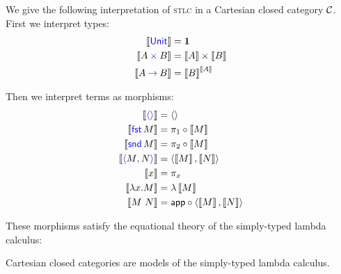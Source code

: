 We give the following interpretation of \textsc{stlc} 
in a Cartesian closed category $\mathcal C$. 
First we interpret types:
\begin{align*}
  \left\llbracket \mathsf{{\color{blue}Unit}} \right\rrbracket &= \mathbf{1} \\ 
  \left\llbracket A \mathbin{{\color{blue}\times}} B \right\rrbracket &= \left\llbracket A \right\rrbracket \times \left\llbracket B \right\rrbracket \\ 
  \left\llbracket A \mathbin{{\color{blue}\to}} B \right\rrbracket &= \left\llbracket B \right\rrbracket^{\left\llbracket A \right\rrbracket}
\end{align*}

Then we interpret terms as morphisms:
    \begin{align*}
    \llbr{\plunit} &= \angled{} \\
    \llbr{\plfst{M}} &= \pi_1 \circ \llbr{M} \\
    \llbr{\plsnd{M}} &= \pi_2 \circ \llbr{M} \\
    \llbr{\plpair{M}{N}} &= \angled{\llbr{M},\llbr{N}} \\
    \llbr{x} &= \pi_x \\
    \llbr{\lambda x . M} &= \lambda \dbracket{M} \\ 
    \llbr{M~N} &= \app \circ \langle \dbracket{M}, \dbracket{N} \rangle
  \end{align*}

These morphisms satisfy the equational theory of the simply-typed 
lambda calculus:
\begin{theorem}
  Cartesian closed categories are models of the simply-typed 
  lambda calculus.
\end{theorem}



